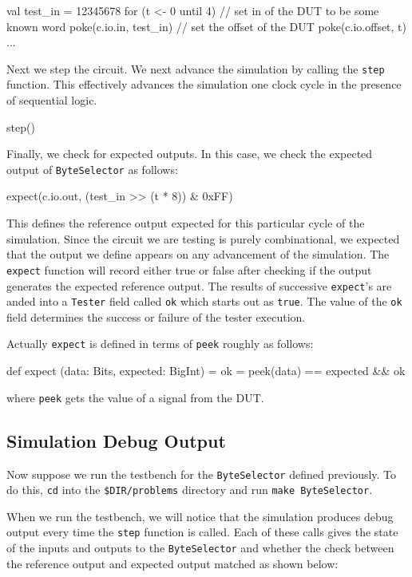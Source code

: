 \begin{scala}
val test_in = 12345678
for (t <- 0 until 4) {
  // set in of the DUT to be some known word
  poke(c.io.in,     test_in)
  // set the offset of the DUT
  poke(c.io.offset, t)
  ...
}
\end{scala}

Next we step the circuit.  We next advance the simulation by calling the \verb+step+ function. This effectively advances the simulation one clock cycle in the presence of sequential logic. 

\begin{scala}
step()
\end{scala}

Finally, we check for expected outputs.
In this case, we check the expected output of \verb+ByteSelector+ as follows:

\begin{scala}
expect(c.io.out, (test_in >> (t * 8)) & 0xFF)
\end{scala}

This defines the reference output expected for this particular cycle of the simulation. Since the circuit we are testing is purely combinational, we expected that the output we define appears on any advancement of the simulation.  The \verb+expect+ function will record either true or false after checking if the output generates the expected reference output. The results of successive \verb+expect+'s are anded into a \verb+Tester+ field called \verb+ok+ which starts out as \verb+true+.  The value of the \verb+ok+ field determines the success or failure of the tester execution.

Actually \verb+expect+ is defined in terms of \verb+peek+ roughly as follows:

\begin{scala}
def expect (data: Bits, expected: BigInt) = 
  ok = peek(data) == expected && ok
\end{scala}

where \verb+peek+ gets the value of a signal from the DUT.

\subsection{Simulation Debug Output}

Now suppose we run the testbench for the \verb+ByteSelector+ defined previously. To do this, \verb+cd+ into the \verb+$DIR/problems+ directory and run \verb+make ByteSelector+.

When we run the testbench, we will notice that the simulation produces debug output every time the \verb+step+ function is called. Each of these calls gives the state of the inputs and outputs to the \verb+ByteSelector+ and whether the check between the reference output and expected output matched as shown below:

